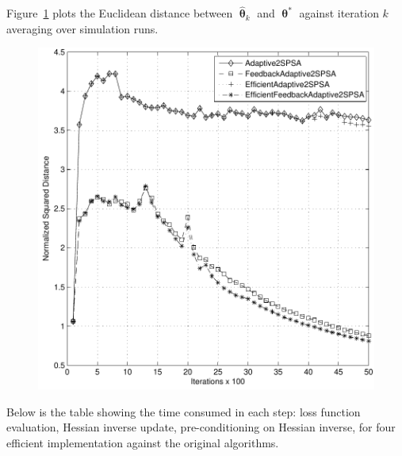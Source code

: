 \documentclass[conference]{IEEEtran}
\newcommand{\htheta}{\bm{\hat{\uptheta}}}
\begin{document}
Figure~\ref{fig:dist} plots the Euclidean distance between
$\htheta_k$ and $\bm{\uptheta}^{*}$ against iteration $k$ averaging
over \nruns simulation runs.
\begin{figure}[htbp]
  \centering
  \includegraphics[width=1\columnwidth]{../res/NoNoise_normalized_squared_distance_per_iteration.pdf}
  \caption{}
  \label{fig:dist}
\end{figure}

Below is the table showing the time consumed in each step:
loss function evaluation, Hessian inverse update, pre-conditioning on
Hessian inverse, for four efficient implementation against the
original algorithms.
\begin{table}[htbp]
  \centering
  \caption{A2SPSA=Adaptive2SPSA, EA2SPSA=EfficientAdaptive2SPSA, FA2SPSA=FeedbackAdaptive2SPSA,EFA2SPSA=EfficientFeedbackAdaptive2SPSA}
  \label{tab:time}
\end{table}
\end{document}

